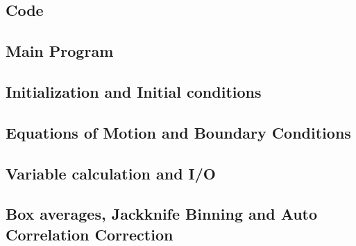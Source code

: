 \begin{appendices}
    \section{Code}
    \subsection{Main Program}
    
    \subsection{Initialization and Initial conditions}
    
    \subsection{Equations of Motion and Boundary Conditions}
    
    \subsection{Variable calculation and I/O}
    
    \subsection{Box averages, Jackknife Binning and Auto Correlation Correction}
    
\end{appendices}
